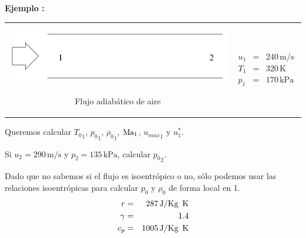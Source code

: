 	
	\textbf{Ejemplo :}
		\begin{tabular}{cc}
			\begin{minipage}[c]{0.5\textwidth}%
\begin{center}
	\includegraphics[width=1\linewidth]{TeX_files/chapter11-Compresible/ejemplo1}
\end{center}
Flujo adiabático de aire
			\end{minipage} & %
			\begin{minipage}[c]{0.4\textwidth}%
				
				\begin{eqnarray*}
					u_{1} & = & 240\,\text{m/s}\\
					T_{1} & = & 320\,\text{K}\\
					p_{1} & = & 170\,\text{kPa}
				\end{eqnarray*}
			\end{minipage}\tabularnewline
		\end{tabular}

\bigskip
		
		Queremos calcular ${T_{0}}_{1}$, ${p_{0}}_{1}$, ${\rho_{0}}_{1}$,
		$\text{Ma}_{1}$, ${u_{max}}_{1}$ y $u_{1}^{*}$.
		
		Si $u_{2}=290\,\text{m/s}$ y $p_{2}=135\,\text{kPa}$, calcular ${p_{0}}_{2}$.
		
		Dado que no sabemos si el flujo es isoentrópico o no, sólo podemos
		usar las relaciones isoentrópicas para calcular $p_{0}$ y $\rho_{0}$
		de forma local en 1. {\footnotesize{}
			\begin{eqnarray*}
				r & = & 287\,\text{J/Kg\, K}\\
				\gamma & = & 1.4\\
				c_{p} & = & 1005\,\text{J/Kg\, K}
			\end{eqnarray*}
		}{\footnotesize\par}

